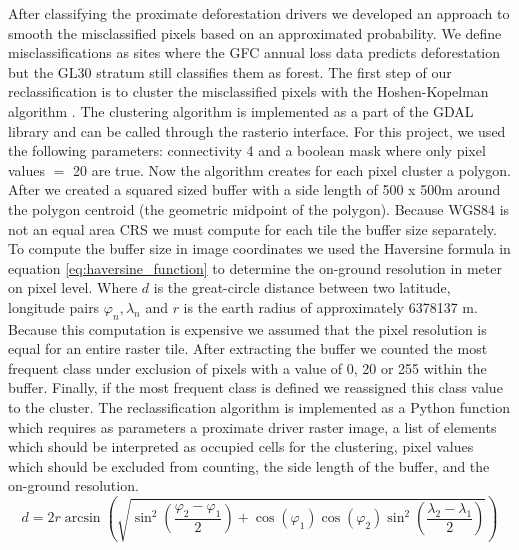 			After classifying the proximate deforestation drivers we developed an approach to smooth the misclassified pixels based on an approximated probability. We define misclassifications as sites where the \ac{GFC} annual loss data predicts deforestation but the \ac{GL30} stratum still classifies them as forest. The first step of our reclassification is to cluster the misclassified pixels with the Hoshen-Kopelman algorithm \citep{Hoshen1998}. The clustering algorithm is implemented as a part of the \ac{GDAL} library and can be called through the rasterio interface. For this project, we used the following parameters: connectivity 4 and a boolean mask where only pixel values $=$ 20 are true. Now the algorithm creates for each pixel cluster a polygon. After we created a squared sized buffer with a side length of 500 x 500m around the polygon centroid (the geometric midpoint of the polygon). Because \ac{WGS84} is not an equal area \ac{CRS} we must compute for each tile the buffer size separately. To compute the buffer size in image coordinates we used the Haversine formula in equation \ref{eq:haversine_function} to determine the on-ground resolution in meter on pixel level. Where $d$ is the great-circle distance between two latitude, longitude pairs $\varphi_n, \lambda_n$ and $r$ is the earth radius of approximately 6378137 m. Because this computation is expensive we assumed that the pixel resolution is equal for an entire raster tile. After extracting the buffer we counted the most frequent class under exclusion of pixels with a value of 0, 20 or 255 within the buffer. Finally, if the most frequent class is defined we reassigned this class value to the cluster. The reclassification algorithm is implemented as a Python function which requires as parameters a proximate driver raster image, a list of elements which should be interpreted as occupied cells for the clustering, pixel values which should be excluded from counting, the side length of the buffer, and the on-ground resolution. 
			\begin{equation}
			\label{eq:haversine_function}
				d = 2r\arcsin\left(
				\sqrt{
						\sin^2\left(\frac{\varphi_2-\varphi_1}{2}\right)+\cos\left(\varphi_1\right)\cos\left(\varphi_2\right)\sin^2\left(\frac{\lambda_2-\lambda_1}{2}\right)
				}
				\right)
			\end{equation}

